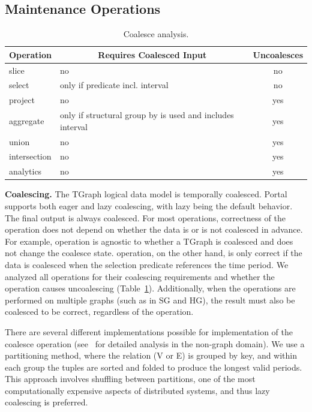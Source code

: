 \subsection{Maintenance Operations}
\label{sec:sys:maint}

\begin{table}
\small
\begin{tabular}{ l | p{4cm} | c }
\hline
\multicolumn{1}{l|}{\bfseries Operation} & \multicolumn{1}{c|}{\bfseries Requires Coalesced Input} & \multicolumn{1}{c}{\bfseries Uncoalesces} \\ \hline
slice & no & no \\ \hline
select & only if predicate incl. interval & no \\ \hline
project & no & yes \\ \hline
aggregate & only if structural group by is used and includes interval & yes \\ \hline
union & no & yes \\ \hline
intersection & no & yes \\ \hline
analytics & no & yes \\
\hline
\end{tabular}
\caption{Coalesce analysis.}
\label{tab:coalesce}
\end{table}

{\bf Coalescing.}  The TGraph logical data model is temporally
coalesced.  Portal supports both eager and lazy coalescing, with lazy
being the default behavior.  The final output is always coalesced.
For most operations, correctness of the operation does not depend on
whether the data is or is not coalesced in advance.  For example,
 operation is agnostic to whether a TGraph is coalesced
and does not change the coalesce state.   operation, on
the other hand, is only correct if the data is coalesced when the
selection predicate references the time period.  We analyzed all
operations for their coalescing requirements and whether the operation
causes uncoalescing (Table~\ref{tab:coalesce}).  Additionally, when
the operations are performed on multiple graphs (such as in SG and
HG), the result must also be coalesced to be correct, regardless of
the operation.

There are several different implementations possible for
implementation of the coalesce operation
(see~\cite{DBLP:conf/vldb/BohlenSS96} for detailed analysis in the
non-graph domain).  We use a partitioning method, where the relation
(V or E) is grouped by key, and within each group the tuples are
sorted and folded to produce the longest valid periods.  This approach
involves shuffling between partitions, one of the most computationally
expensive aspects of distributed systems, and thus lazy coalescing is
preferred.

